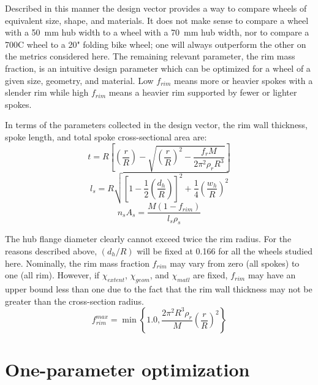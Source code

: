 \documentclass[\rootdir/thesis.tex]{subfiles}
\begin{document}
Described in this manner the design vector provides a way to compare wheels of equivalent size, shape, and materials. It does not make sense to compare a wheel with a \SI{50}{mm} hub width to a wheel with a \SI{70}{mm} hub width, nor to compare a 700C wheel to a 20" folding bike wheel; one will always outperform the other on the metrics considered here. The remaining relevant parameter, the rim mass fraction, is an intuitive design parameter which can be optimized for a wheel of a given size, geometry, and material. Low $f_{rim}$ means more or heavier spokes with a slender rim while high $f_{rim}$ means a heavier rim supported by fewer or lighter spokes.


In terms of the parameters collected in the design vector, the rim wall thickness, spoke length, and total spoke cross-sectional area are:
\begin{equation}
\label{eqn:design:t}
t = R\left[ \left(\frac{r}{R}\right) - \sqrt{\left(\frac{r}{R}\right)^2 - \frac{f_rM}{2\pi^2\rho_rR^3}}\right]
\end{equation}
\begin{equation}
\label{eqn:design:ls}
l_s = R\sqrt{\left[1-\frac{1}{2}\left(\frac{d_h}{R}\right)\right]^2 + \frac{1}{4}\left(\frac{w_h}{R}\right)^2}
\end{equation}
\begin{equation}
\label{eqn:design:nsAs}
n_sA_s = \frac{M(1-f_{rim})}{l_s\rho_s}
\end{equation}

The hub flange diameter clearly cannot exceed twice the rim radius. For the reasons described above, $(d_h/R)$ will be fixed at 0.166 for all the wheels studied here. Nominally, the rim mass fraction $f_{rim}$ may vary from zero (all spokes) to one (all rim). However, if $\chi_{extent}$, $\chi_{geom}$, and $\chi_{matl}$ are fixed, $f_{rim}$ may have an upper bound less than one due to the fact that the rim wall thickness may not be greater than the cross-section radius.
\begin{equation}
\label{eqn:frim_max}
f_{rim}^{max} = \min\left\lbrace 1.0, \frac{2\pi^2 R^3\rho_r}{M}\left(\frac{r}{R}\right)^2 \right\rbrace
\end{equation}

\section{One-parameter optimization}
\end{document}
